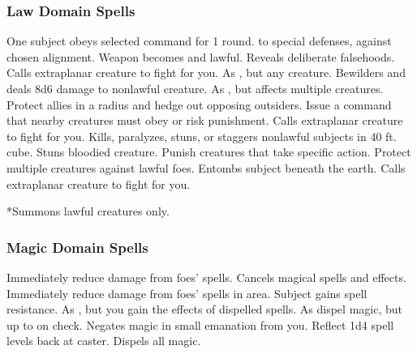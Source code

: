 \subsubsection{Law Domain Spells}

\begin{spelllist}
   One subject obeys selected command for 1 round.
    to special defenses,  against chosen alignment.
   Weapon becomes  and lawful.
  \spellhead[2]{}
   Reveals deliberate falsehoods.
   Calls extraplanar creature to fight for you.
   As , but any creature.
   Bewilders and deals 8d6 damage to nonlawful creature.
   As , but affects multiple creatures.
   Protect allies in a \areamed radius and hedge out opposing outsiders.
   Issue a command that nearby creatures must obey or risk punishment.
   Calls extraplanar creature to fight for you.
   Kills, paralyzes, stuns, or staggers nonlawful subjects in 40 ft. cube.
   Stuns bloodied creature.
   Punish creatures that take specific action.
  \F Protect multiple creatures against lawful foes.
   Entombs subject beneath the earth.
   Calls extraplanar creature to fight for you.
\end{spelllist}
*Summons lawful creatures only.

\subsubsection{Magic Domain Spells}

\begin{spelllist}
   Immediately reduce damage from foes' spells.
  \spellhead[1]{}
  \spellhead[2]{}
  \spellhead[2]{}
   Cancels magical spells and effects.
   Immediately reduce damage from foes' spells in area.
  \spellhead[4]{}
   Subject gains spell resistance.
  \spellhead[5]{}
   As , but you gain the effects of dispelled spells.
  \spellhead[6]{}
   As dispel magic, but up to  on check.
   Negates magic in small emanation from you.
   Reflect 1d4 spell levels back at caster.
  \spellhead[8]{}
  \spellhead[8]{}
   Dispels all magic.
  \spellhead[9]{}
\end{spelllist}

